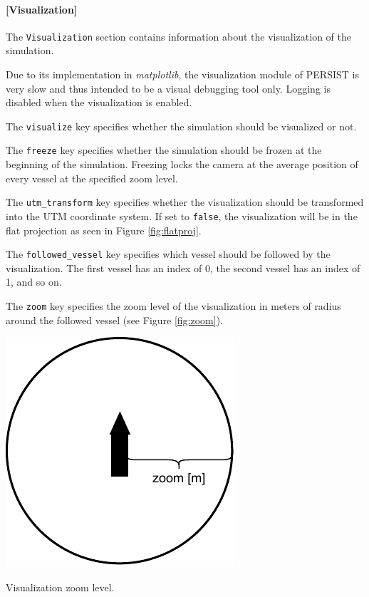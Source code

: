 \documentclass[
	a4paper, %
	12pt, %
]{persist}
\begin{document}
\paragraph{[Visualization]}

The \verb|Visualization| section contains information about the visualization of the simulation. 

\begin{note}
	Due to its implementation in \emph{matplotlib}, the visualization module of PERSIST is very slow and thus intended to be a visual debugging tool only. Logging is  disabled when the visualization is enabled.
\end{note}

The \verb|visualize| key specifies whether the simulation should be visualized or not. 

The \verb|freeze| key specifies whether the simulation should be frozen at the beginning of the simulation. Freezing locks the camera at the average position of every vessel at the specified zoom level.

The \verb|utm_transform| key specifies whether the visualization should be transformed into the UTM coordinate system. If set to \verb|false|, the visualization will be in the flat projection as seen in Figure \ref{fig:flatproj}.

The \verb|followed_vessel| key specifies which vessel should be followed by the visualization. The first vessel has an index of 0, the second vessel has an index of 1, and so on. 

The \verb|zoom| key specifies the zoom level of the visualization in meters of radius around the followed vessel (see Figure \ref{fig:zoom}).
\begin{marginfigure}
	\includegraphics[width=\linewidth]{img/zoom.pdf}
	\caption{Visualization zoom level.}
	\label{fig:zoom}
\end{marginfigure}
\end{document}
